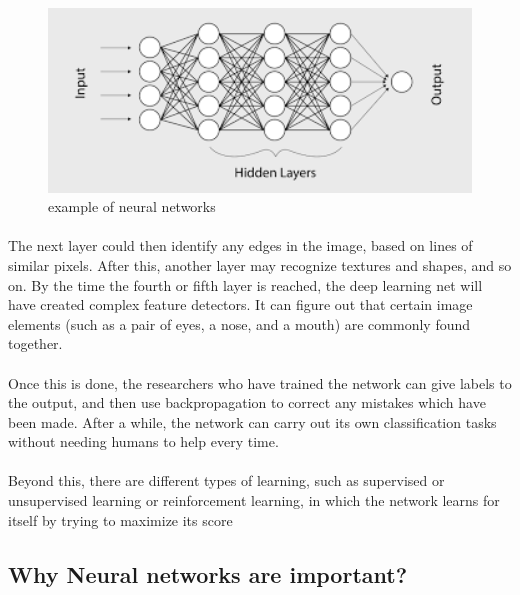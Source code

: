 \begin{figure}[H]
	\centering
	\includegraphics[width=1.0\textwidth]{CH1-introduction/sec3_neural_networks/nn.png}
	\caption{example of neural networks}
	\label{fig:nn}
\end{figure} 

\paragraph{}
The next layer could then identify any edges in the image, based on lines of similar pixels. After this, another layer may recognize textures and shapes, and so on. By the time the fourth or fifth layer is reached, the deep learning net will have created complex feature detectors. It can figure out that certain image elements (such as a pair of eyes, a nose, and a mouth) are commonly found together.
\paragraph{}
Once this is done, the researchers who have trained the network can give labels to the output, and then use backpropagation to correct any mistakes which have been made. After a while, the network can carry out its own classification tasks without needing humans to help every time.
\paragraph{}
Beyond this, there are different types of learning, such as supervised or unsupervised learning or reinforcement learning, in which the network learns for itself by trying to maximize its score

\subsection{Why Neural networks are important? }
